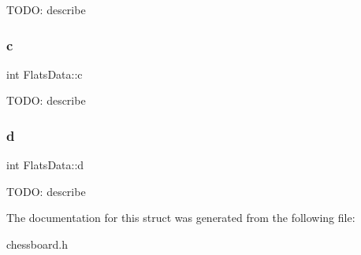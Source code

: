 T\+O\+DO\+: describe \mbox{\label{struct_flats_data_a19152c81d88747bd221d1bd2e2a01077}} 
\subsubsection{\texorpdfstring{c}{c}}
{\footnotesize\ttfamily int Flats\+Data\+::c}

T\+O\+DO\+: describe \mbox{\label{struct_flats_data_a2244298a5ff35dcd06d54b283b485e35}} 
\subsubsection{\texorpdfstring{d}{d}}
{\footnotesize\ttfamily int Flats\+Data\+::d}

T\+O\+DO\+: describe 

The documentation for this struct was generated from the following file\+:\begin{DoxyCompactItemize}
\item 
chessboard.\+h\end{DoxyCompactItemize}
